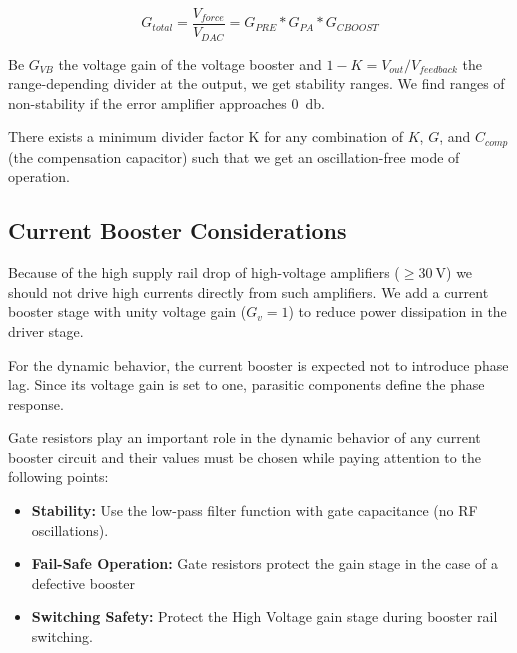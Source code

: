 \begin{equation}
    \label{eq:booster-gain}
    G_{total} = \frac{V_{force}}{V_{DAC}} = G_{PRE} * G_{PA}
    * G_{CBOOST}
\end{equation}

Be $G_{VB}$ the voltage gain of the voltage booster
and $1 - K = V_{out} / V_{feedback}$ the range-depending divider at the output,
we get stability ranges.
We find ranges of non-stability if the error amplifier approaches
\SI{0}{\decibel}.

There exists a minimum divider factor K for any combination of $K$, $G$, and
$C_{comp}$ (the compensation capacitor) such that we get an oscillation-free
mode of operation.


\subsection{Current Booster Considerations}
\label{subsec:current-booster-considerations}

Because of the high supply rail drop of high-voltage amplifiers
(\(\ge \SI{30}{\volt}\)) we should not drive high currents directly from such
amplifiers.
We add a current booster stage with unity voltage gain ($G_v=1$) to reduce power
dissipation in the driver stage.

For the dynamic behavior, the current booster is expected not to introduce
phase lag.
Since its voltage gain is set to one, parasitic components define
the phase response.

Gate resistors play an important role in the dynamic
behavior of any current booster circuit and their values must be chosen
while paying attention to the following points:

\begin{itemize}[topsep=8pt,itemsep=4pt,partopsep=4pt, parsep=4pt]

    \item
    \textbf{Stability:} Use the low-pass filter function with gate
    capacitance (no RF oscillations).

    \item
    \textbf{Fail-Safe Operation:} Gate resistors protect the gain
    stage in the case of a defective booster

    \item
    \textbf{Switching Safety:} Protect the High Voltage gain stage
    during booster rail switching.
\end{itemize}

